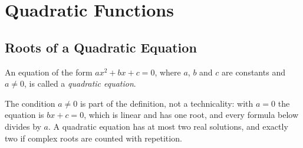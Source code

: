 \documentclass[11pt,a4paper]{article}
\theoremstyle{definition}
\begin{document}
\pagebreak
\section{Quadratic Functions}



\subsection{Roots of a Quadratic Equation }

An equation of the form $ax^{2}+bx+c=0$, where $a$, $b$ and $c$ are constants and
$a\neq 0$, is called a \emph{quadratic equation}.

The condition $a\neq 0$ is part of the definition, not a technicality: with $a=0$
the equation is $bx+c=0$, which is linear and has one root, and every formula
below divides by $a$. A quadratic equation has at most two real solutions, and
exactly two if complex roots are counted with repetition.\\
\end{document}
